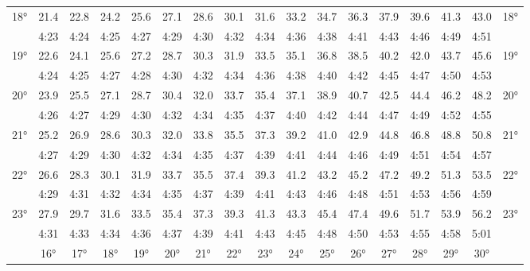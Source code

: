 \begin{footnotesize}
\begin{tabular}{c || c | c | c | c | c | c | c | c | c | c | c | c | c | c | c || c}
		\multirow{2}{*}{18°}&21.4&22.8&24.2&25.6&27.1&28.6&30.1&31.6&33.2&34.7&36.3&37.9&39.6&41.3&43.0&\multirow{2}{*}{18°}\\ \space&4:23&4:24&4:25&4:27&4:29&4:30&4:32&4:34&4:36&4:38&4:41&4:43&4:46&4:49&4:51&\space\\\hline
		\multirow{2}{*}{19°}&22.6&24.1&25.6&27.2&28.7&30.3&31.9&33.5&35.1&36.8&38.5&40.2&42.0&43.7&45.6&\multirow{2}{*}{19°}\\ \space&4:24&4:25&4:27&4:28&4:30&4:32&4:34&4:36&4:38&4:40&4:42&4:45&4:47&4:50&4:53&\space\\\hline
		\multirow{2}{*}{20°}&23.9&25.5&27.1&28.7&30.4&32.0&33.7&35.4&37.1&38.9&40.7&42.5&44.4&46.2&48.2&\multirow{2}{*}{20°}\\ \space&4:26&4:27&4:29&4:30&4:32&4:34&4:35&4:37&4:40&4:42&4:44&4:47&4:49&4:52&4:55&\space\\\hline
		\multirow{2}{*}{21°}&25.2&26.9&28.6&30.3&32.0&33.8&35.5&37.3&39.2&41.0&42.9&44.8&46.8&48.8&50.8&\multirow{2}{*}{21°}\\ \space&4:27&4:29&4:30&4:32&4:34&4:35&4:37&4:39&4:41&4:44&4:46&4:49&4:51&4:54&4:57&\space\\\hline
		\multirow{2}{*}{22°}&26.6&28.3&30.1&31.9&33.7&35.5&37.4&39.3&41.2&43.2&45.2&47.2&49.2&51.3&53.5&\multirow{2}{*}{22°}\\ \space&4:29&4:31&4:32&4:34&4:35&4:37&4:39&4:41&4:43&4:46&4:48&4:51&4:53&4:56&4:59&\space\\\hline
		\multirow{2}{*}{23°}&27.9&29.7&31.6&33.5&35.4&37.3&39.3&41.3&43.3&45.4&47.4&49.6&51.7&53.9&56.2&\multirow{2}{*}{23°}\\ \space&4:31&4:33&4:34&4:36&4:37&4:39&4:41&4:43&4:45&4:48&4:50&4:53&4:55&4:58&5:01&\space\\\hline
		\hline\space &16°&17°&18°&19°&20°&21°&22°&23°&24°&25°&26°&27°&28°&29°&30°
\end{tabular}\end{footnotesize}

